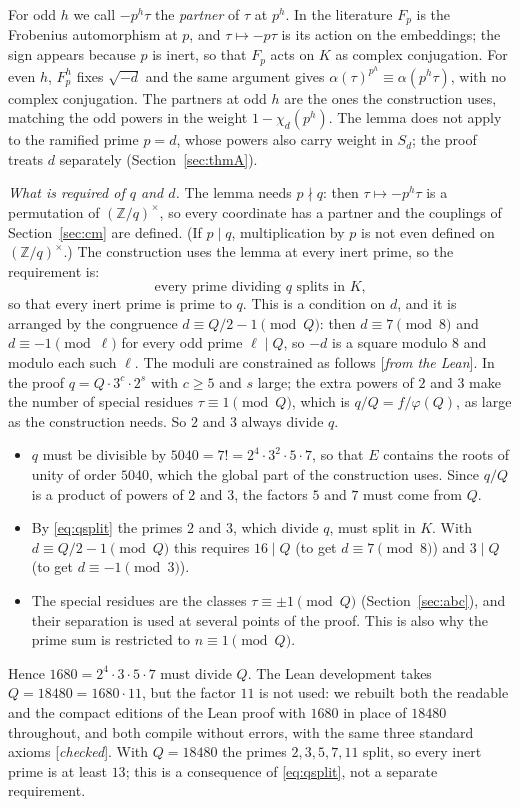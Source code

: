 \documentclass[11pt]{amsart}
\numberwithin{equation}{section}
\theoremstyle{definition}
\theoremstyle{remark}
\newcommand{\Z}{\mathbb Z}
\newcommand{\status}[1]{\textup{[\emph{#1}]}}
\begin{document}
For odd $h$ we call $-p^h\tau$ the \emph{partner} of $\tau$ at $p^h$. In the literature $F_p$ is the Frobenius automorphism at $p$, and $\tau\mapsto-p\tau$ is its action on the embeddings; the sign appears because $p$ is inert, so that $F_p$ acts on $K$ as complex conjugation. For even $h$, $F_p^h$ fixes $\sqrt{-d}$ and the same argument gives $\alpha(\tau)^{p^h}\equiv\alpha(p^h\tau)$, with no complex conjugation. The partners at odd $h$ are the ones the construction uses, matching the odd powers in the weight $1-\chi_d(p^h)$. The lemma does not apply to the ramified prime $p=d$, whose powers also carry weight in $S_d$; the proof treats $d$ separately (Section~\ref{sec:thmA}).

\emph{What is required of $q$ and $d$.} The lemma needs $p\nmid q$: then $\tau\mapsto-p^h\tau$ is a permutation of $(\Z/q)^\times$, so every coordinate has a partner and the couplings of Section~\ref{sec:cm} are defined. (If $p\mid q$, multiplication by $p$ is not even defined on $(\Z/q)^\times$.) The construction uses the lemma at every inert prime, so the requirement is:
\begin{equation}\label{eq:qsplit}
 \text{every prime dividing $q$ splits in $K$,}
\end{equation}
so that every inert prime is prime to $q$. This is a condition on $d$, and it is arranged by the congruence $d\equiv Q/2-1\pmod Q$: then $d\equiv7\pmod8$ and $d\equiv-1\pmod\ell$ for every odd prime $\ell\mid Q$, so $-d$ is a square modulo $8$ and modulo each such $\ell$. The moduli are constrained as follows \status{from the Lean}. In the proof $q=Q\cdot3^c\cdot2^s$ with $c\ge5$ and $s$ large; the extra powers of $2$ and $3$ make the number of special residues $\tau\equiv1\pmod Q$, which is $q/Q=f/\varphi(Q)$, as large as the construction needs. So $2$ and $3$ always divide $q$.
\begin{itemize}[leftmargin=2em]
\item $q$ must be divisible by $5040=7!=2^4\cdot3^2\cdot5\cdot7$, so that $E$ contains the roots of unity of order $5040$, which the global part of the construction uses. Since $q/Q$ is a product of powers of $2$ and $3$, the factors $5$ and $7$ must come from $Q$.
\item By \eqref{eq:qsplit} the primes $2$ and $3$, which divide $q$, must split in $K$. With $d\equiv Q/2-1\pmod Q$ this requires $16\mid Q$ (to get $d\equiv7\pmod 8$) and $3\mid Q$ (to get $d\equiv-1\pmod 3$).
\item The special residues are the classes $\tau\equiv\pm1\pmod Q$ (Section~\ref{sec:abc}), and their separation is used at several points of the proof. This is also why the prime sum is restricted to $n\equiv1\pmod Q$.
\end{itemize}
Hence $1680=2^4\cdot3\cdot5\cdot7$ must divide $Q$. The Lean development takes $Q=18480=1680\cdot11$, but the factor $11$ is not used: we rebuilt both the readable and the compact editions of the Lean proof with $1680$ in place of $18480$ throughout, and both compile without errors, with the same three standard axioms \status{checked}. With $Q=18480$ the primes $2,3,5,7,11$ split, so every inert prime is at least $13$; this is a consequence of \eqref{eq:qsplit}, not a separate requirement.
\end{document}
